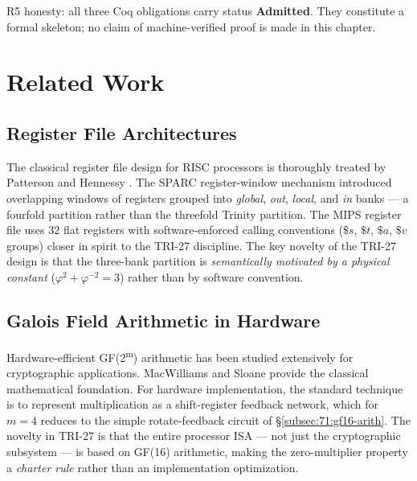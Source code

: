 \noindent R5 honesty: all three Coq obligations carry status
\textbf{Admitted}.  They constitute a formal skeleton; no claim of
machine-verified proof is made in this chapter.

\section{Related Work}
\label{sec:71:related}

\subsection{Register File Architectures}
\label{subsec:71:related-regfile}

The classical register file design for RISC processors is thoroughly
treated by Patterson and Hennessy \cite{patterson2014computer}.
The SPARC register-window mechanism introduced overlapping windows of
registers grouped into \emph{global}, \emph{out}, \emph{local}, and
\emph{in} banks — a fourfold partition rather than the threefold
Trinity partition.  The MIPS register file uses 32 flat registers
with software-enforced calling conventions ($\$s$, $\$t$, $\$a$, $\$v$
groups) closer in spirit to the TRI-27 discipline.  The key
novelty of the TRI-27 design is that the three-bank partition is
\emph{semantically motivated by a physical constant}
($\varphi^2 + \varphi^{-2} = 3$) rather than by software convention.

\subsection{Galois Field Arithmetic in Hardware}
\label{subsec:71:related-gf}

Hardware-efficient GF(2\textsuperscript{m}) arithmetic has been studied
extensively for cryptographic applications.  MacWilliams and Sloane
\cite{macwilliams1977theory} provide the classical mathematical
foundation.  For hardware implementation, the standard technique is
to represent multiplication as a shift-register feedback network,
which for $m = 4$ reduces to the simple rotate-feedback circuit
of \S\ref{subsec:71:gf16-arith}.  The novelty in TRI-27 is that the
entire processor ISA — not just the cryptographic subsystem —
is based on GF(16) arithmetic, making the zero-multiplier property a
\emph{charter rule} rather than an implementation optimization.

